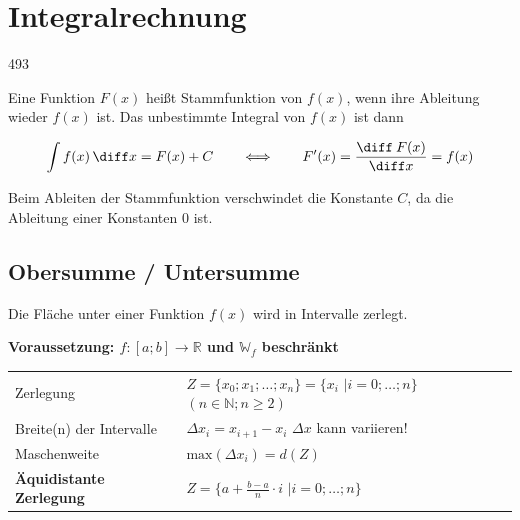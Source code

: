 \section{Integralrechnung}{493}

Eine Funktion $F(x)$ heißt Stammfunktion von $f(x)$, wenn ihre Ableitung wieder $f(x)$ ist. Das unbestimmte Integral von $f(x)$ ist dann

$$ \int f(x) \,  \diff x = F(x) + C  \quad \quad \Longleftrightarrow \quad \quad F'(x) = \frac{\diff \:F(x)}{\diff x} = f(x)$$

Beim Ableiten der Stammfunktion verschwindet die Konstante $C$, da die Ableitung einer Konstanten $0$ ist.


\subsection{Obersumme / Untersumme}

Die Fläche unter einer Funktion $f(x)$ wird in Intervalle zerlegt.

\textbf{Voraussetzung: $f: [a;b] \to \mathbb{R}$ und $\mathbb{W}_f$ beschränkt} 

\renewcommand{\arraystretch}{1.5}
\begin{tabular}{@{}ll@{}}
    Zerlegung                           & $Z = \lbrace x_0; x_1; \ldots ; x_n \rbrace = \lbrace x_i$  $\vert i=0; \ldots ; n \rbrace$ \quad $(n \in \mathbb{N}; n \geq 2)$ \\
    Breite(n) der Intervalle            & $\Delta x_i = x_{i+1} - x_i$ \quad $\Delta x$ kann variieren! \\
    Maschenweite                        & $\mathrm{max}(\Delta x_i) = d(Z)$ \\
    \textbf{Äquidistante Zerlegung}     & $Z = \lbrace a + \frac{b-a}{n} \cdot i $ $\vert i=0; \ldots; n \rbrace$
\end{tabular}

\vspace{0.4cm}

